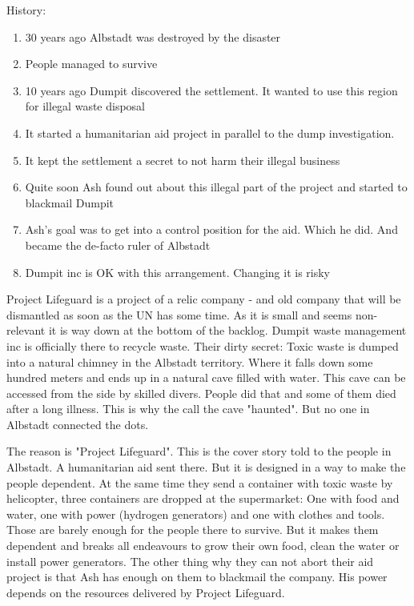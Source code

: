 History:
\begin{enumerate}
    \item 30 years ago Albstadt was destroyed by the disaster
    \item People managed to survive
    \item 10 years ago Dumpit discovered the settlement. It wanted to use this region for illegal waste disposal
    \item It started a humanitarian aid project in parallel to the dump investigation.
    \item It kept the settlement a secret to not harm their illegal business
    \item Quite soon Ash found out about this illegal part of the project and started to blackmail Dumpit
    \item Ash's goal was to get into a control position for the aid. Which he did. And became the de-facto ruler of Albstadt
    \item Dumpit inc is OK with this arrangement. Changing it is risky
\end{enumerate}

Project Lifeguard is a project of a relic company - and old company that will be dismantled as soon as the UN has some time. As it is small and seems non-relevant it is way down at the bottom of the backlog.
Dumpit waste management inc is officially there to recycle waste. Their dirty secret: Toxic waste is dumped into a natural chimney in the Albstadt territory. Where it falls down some hundred meters and ends up in a natural cave filled with water. This cave can be accessed from the side by skilled divers. People did that and some of them died after a long illness. This is why the call the cave "haunted". But no one in Albstadt connected the dots.

The reason is "Project Lifeguard". This is the cover story told to the people in Albstadt. A humanitarian aid sent there. But it is designed in a way to make the people dependent. At the same time they send a container with toxic waste by helicopter, three containers are dropped at the supermarket: One with food and water, one with power (hydrogen generators) and one with clothes and tools.
Those are barely enough for the people there to survive. But it makes them dependent and breaks all endeavours to grow their own food, clean the water or install power generators.
The other thing why they can not abort their aid project is that Ash has enough on them to blackmail the company. His power depends on the resources delivered by Project Lifeguard.

